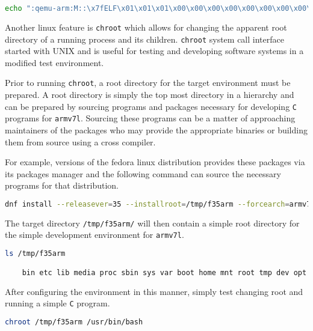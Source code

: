 \begin{lstlisting}[language=Bash]
	echo ":qemu-arm:M::\x7fELF\x01\x01\x01\x00\x00\x00\x00\x00\x00\x00\x00\x00\x02\x00\x28\x00:\xff\xff\xff\xff\xff\xff\xff\x00\xff\xff\xff\xff\xff\xff\xff\xff\xfe\xff\xff\xff:/usr/bin/qemu-arm-static:F" > /proc/sys/fs/binfmt_misc
\end{lstlisting}

Another linux feature is \texttt{chroot} which allows for changing the apparent root directory of a running process and its children. \texttt{chroot} system call interface started with UNIX and is useful for testing and developing software systems in a modified test environment.

Prior to running \texttt{chroot}, a root directory for the target environment must be prepared. A root directory is simply the top most directory in a hierarchy and can be prepared by sourcing programs and packages necessary for developing \texttt{C} programs for \texttt{armv7l}. Sourcing these programs can be a matter of approaching maintainers of the packages who may provide the appropriate binaries or building them from source using a cross compiler.

For example, versions of the fedora linux distribution provides these packages via its packages manager and the following command can source the necessary programs for that distribution.

\begin{lstlisting}[language=Bash]
	dnf install --releasever=35 --installroot=/tmp/f35arm --forcearch=armv7hl --repo=fedora --repo=updates systemd passwd dnf fedora-release vim-minimal m4 cmake gcc-c++ tar gcc git make tmux -y
\end{lstlisting}

The target directory \texttt{/tmp/f35arm/} will then contain a simple root directory for the simple development environment for \texttt{armv7l}.

\begin{lstlisting}[language=Bash]
	ls /tmp/f35arm

	bin etc lib media proc sbin sys var boot home mnt root tmp dev opt usr
\end{lstlisting}

After configuring the environment in this manner, simply test changing root and running a simple \texttt{C} program.

\begin{lstlisting}[language=Bash]
	chroot /tmp/f35arm /usr/bin/bash
\end{lstlisting}

